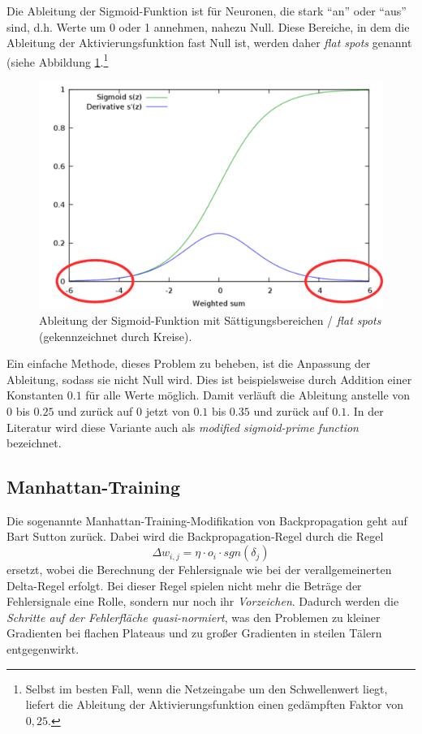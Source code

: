 Die Ableitung der Sigmoid-Funktion ist für Neuronen, die stark "`an"' oder "`aus"' sind, d.h. Werte um 0 oder 1 annehmen, nahezu Null. Diese Bereiche, in dem die Ableitung der Aktivierungsfunktion fast Null ist, werden daher \emph{flat spots} genannt (siehe Abbildung \ref{fig:ch03_saettigung-sigmoid-ableitung}.\footnote{Selbst im besten Fall, wenn die Netzeingabe um den Schwellenwert liegt, liefert die Ableitung der Aktivierungsfunktion einen gedämpften Faktor von $0,25$.}

\begin{figure}[ht!] \centering 
	\includegraphics[width=\linewidth]{figures/ch03_saettigung-sigmoid-ableitung.pdf}
	\caption{Ableitung der Sigmoid-Funktion mit Sättigungsbereichen / \emph{flat spots} (gekennzeichnet durch Kreise).}
	\label{fig:ch03_saettigung-sigmoid-ableitung}
\end{figure}

Ein einfache Methode, dieses Problem zu beheben, ist die Anpassung der Ableitung, sodass sie nicht Null wird. Dies ist beispielsweise durch Addition einer Konstanten $0.1$ für alle Werte möglich.
Damit verläuft die Ableitung anstelle von $0$ bis $0.25$ und zurück auf $0$ jetzt von $0.1$ bis $0.35$ und zurück auf $0.1$.
In der Literatur wird diese Variante auch als \emph{modified sigmoid-prime function} bezeichnet.


\subsection*{Manhattan-Training}
Die sogenannte Manhattan-Training-Modifikation von Backpropagation geht auf Bart Sutton zurück. Dabei wird die Backpropagation-Regel durch die Regel
\[
	\Delta w_{i,j} = \eta \cdot o_i \cdot sgn( \delta_j)
\]
ersetzt, wobei die Berechnung der Fehlersignale wie bei der verallgemeinerten Delta-Regel erfolgt. Bei dieser Regel spielen nicht mehr die Beträge der Fehlersignale eine Rolle, sondern nur noch ihr \emph{Vorzeichen}. Dadurch werden die \emph{Schritte auf der Fehlerfläche quasi-normiert}, was den Problemen zu kleiner Gradienten bei flachen Plateaus und zu großer Gradienten in steilen Tälern entgegenwirkt.

